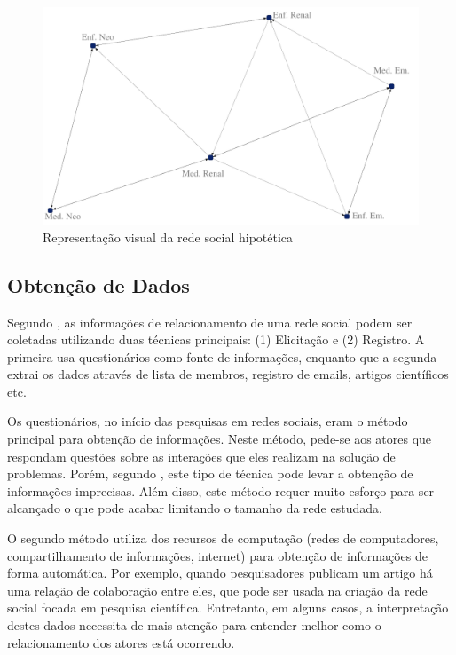 \begin{figure}[htbp]
\centering
 \includegraphics[width=\textwidth]{figuras/rede-exemplo.pdf}
 \caption{Representação visual da rede social hipotética}
\label{fig:social-network-example}
\end{figure}

\subsection{Obtenção de Dados}
Segundo \cite{de2011exploratory}, as informações de relacionamento de uma rede social podem ser coletadas utilizando duas técnicas principais: (1) Elicitação e (2) Registro. A primeira usa questionários como fonte de informações, enquanto que a segunda extrai os dados através de lista de membros, registro de emails, artigos científicos etc.

Os questionários, no início das pesquisas em redes sociais, eram o método principal para obtenção de informações. Neste método, pede-se aos atores que respondam questões sobre as interações que eles realizam na solução de problemas. Porém, segundo \cite{pastor2003statistical,carrington2005models,newman2003ego}, este tipo de técnica pode levar a obtenção de informações imprecisas. Além disso, este método requer muito esforço para ser alcançado o que pode acabar limitando o tamanho da rede estudada. 

O segundo método utiliza dos recursos de computação (redes de computadores, compartilhamento de informações, internet) para obtenção de informações de forma automática. Por exemplo, quando pesquisadores publicam um artigo há uma relação de colaboração entre eles, que pode ser usada na criação da rede social focada em pesquisa científica. Entretanto, em alguns casos, a interpretação destes dados necessita de mais atenção para entender melhor como o relacionamento dos atores está ocorrendo.

